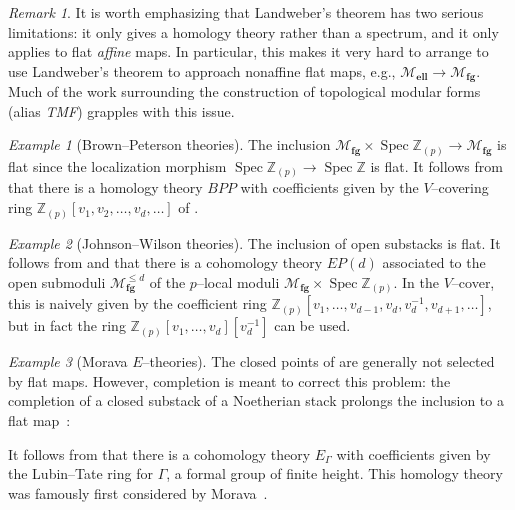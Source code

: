 \documentclass{amsart}
\newcommand{\Z}{\mathbb Z}
\newcommand{\<}{\langle}
\renewcommand{\>}{\rangle}
\newcommand{\moduli}[1]{\mathcal{M}_{\mathbf{#1}}}
\DeclareMathOperator{\Spec}{Spec}
\theoremstyle{plain}
\theoremstyle{definition}
\theoremstyle{remark}
\newtheorem*{remark}{Remark}
\newtheorem*{example}{Example}
\begin{document}
\begin{remark}
It is worth emphasizing that Landweber's theorem has two serious limitations: it only gives a homology theory rather than a spectrum, and it only applies to flat \emph{affine} maps.  In particular, this makes it very hard to arrange to use Landweber's theorem to approach nonaffine flat maps, e.g., $\moduli{ell} \to \moduli{fg}$.  Much of the work surrounding the construction of topological modular forms (alias \textit{TMF}) grapples with this issue.
\end{remark}

\begin{example}[Brown--Peterson theories]
The inclusion $\moduli{fg} \times \Spec \Z_{(p)} \to \moduli{fg}$ is flat since the localization morphism $\Spec \Z_{(p)} \to \Spec \Z$ is flat.  It follows from  that there is a homology theory $BPP$ with coefficients given by the $V$--covering ring $\Z_{(p)}[v_1, v_2, \ldots, v_d, \ldots]$ of .
\end{example}

\begin{example}[Johnson--Wilson theories]\label{JohnsonWilsonTheories}
The inclusion of open substacks is flat.  It follows from  and  that there is a cohomology theory $EP(d)$ associated to the open submoduli $\moduli{fg}^{\le d}$ of the $p$--local moduli $\moduli{fg} \times \Spec \Z_{(p)}$.  In the $V$--cover, this is naively given by the coefficient ring $\Z_{(p)}[v_1, \ldots, v_{d-1}, v_d, v_d^{-1}, v_{d+1}, \ldots]$, but in fact the ring $\Z_{(p)}[v_1, \ldots, v_d][v_d^{-1}]$ can be used.
\end{example}

\begin{example}[Morava $E$--theories]\label{DefnEThy}
The closed points of  are generally not selected by flat maps.  However, completion is meant to correct this problem: the completion of a closed substack of a Noetherian stack prolongs the inclusion to a flat map~\cite{Matsumura}:
\begin{center}
\end{center}
It follows from  that there is a cohomology theory $E_\Gamma$ with coefficients given by the Lubin--Tate ring for $\Gamma$, a formal group of finite height.  This homology theory was famously first considered by Morava~\cite{Morava}.
\end{example}
\end{document}
